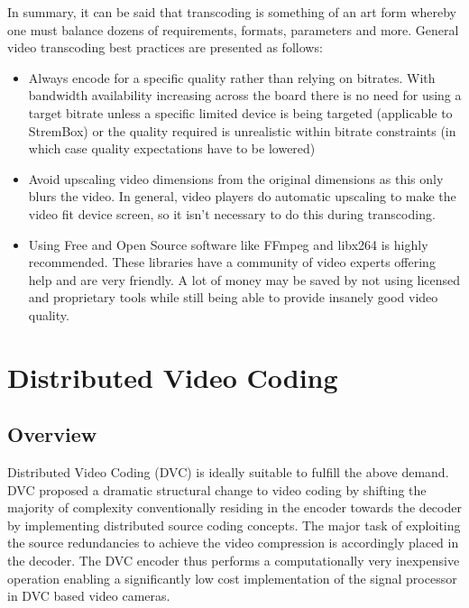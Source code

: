 \documentclass[letterpaper,12pt,titlepage,oneside,final]{report}
\begin{document}
            In summary, it can be said that transcoding is something of an art form whereby one must balance dozens of requirements, formats, parameters and more. General video transcoding best practices are presented as follows:
            \begin{itemize}
                \item{Always encode for a specific quality rather than relying on bitrates. With bandwidth availability increasing across the board there is no need for using a target bitrate unless a specific limited device is being targeted (applicable to StremBox) or the quality required is unrealistic within bitrate constraints (in which case quality expectations have to be lowered)}
                \item{Avoid upscaling video dimensions from the original dimensions as this only blurs the video. In general, video players do automatic upscaling to make the video fit device screen, so it isn't necessary to do this during transcoding.}
                \item{Using Free and Open Source software like FFmpeg and libx264\cite{Video68:online} is highly recommended. These libraries have a community of video experts offering help and are very friendly. A lot of money may be saved by not using licensed and proprietary tools while still being able to provide insanely good video quality.}\cite{Trans44:online}
            \end{itemize}  

\chapter{Distributed Video Coding}
    \section{Overview}
        Distributed Video Coding (DVC) is ideally suitable to fulfill the above demand. DVC proposed a dramatic structural change to video coding by shifting the majority of complexity conventionally residing in the encoder towards the decoder by implementing distributed source coding concepts. The major task of exploiting the source redundancies to achieve the video compression is accordingly placed in the decoder. The DVC encoder thus performs a computationally very inexpensive operation enabling a significantly low cost implementation of the signal processor in DVC based video cameras\cite{Weerakkody2007}.
        
\end{document}
